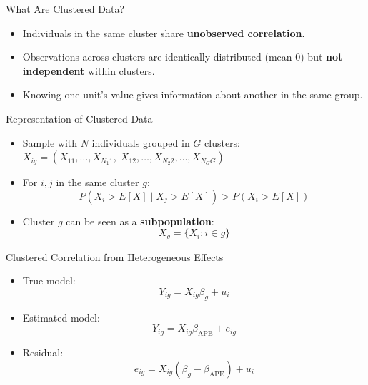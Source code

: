 \documentclass[
  ignorenonframetext,
]{beamer}
\providecommand{\tightlist}{%
  \setlength{\itemsep}{0pt}\setlength{\parskip}{0pt}}
\begin{document}
\begin{frame}{What Are Clustered Data?}
\label{what-are-clustered-data}
\begin{itemize}
\tightlist
\item
  Individuals in the same cluster share \textbf{unobserved
  correlation}.\\
\item
  Observations across clusters are identically distributed (mean 0) but
  \textbf{not independent} within clusters.\\
\item
  Knowing one unit's value gives information about another in the same
  group.
\end{itemize}
\end{frame}

\begin{frame}{Representation of Clustered Data}
\label{representation-of-clustered-data}
\begin{itemize}
\tightlist
\item
  Sample with \(N\) individuals grouped in \(G\) clusters:\\
  \(X_{ig} = (X_{11},\dots,X_{N_1 1},\; X_{12},\dots,X_{N_2 2},\dots,X_{N_G G})\)\\
\item
  For \(i,j\) in the same cluster \(g\):\\
  \[
  P(X_i > E[X] \mid X_j > E[X]) > P(X_i > E[X])
  \]
\item
  Cluster \(g\) can be seen as a \textbf{subpopulation}:\\
  \[
  X_g = \{X_i: i \in g\}
  \]
\end{itemize}
\end{frame}

\begin{frame}
\end{frame}

\begin{frame}{Clustered Correlation from Heterogeneous Effects}
\label{clustered-correlation-from-heterogeneous-effects}
\begin{itemize}
\tightlist
\item
  True model:\\
  \[
  Y_{ig} = X_{ig}\beta_g + u_i
  \]
\item
  Estimated model:\\
  \[
  Y_{ig} = X_{ig}\beta_{\text{APE}} + e_{ig}
  \]
\item
  Residual:\\
  \[
  e_{ig} = X_{ig}(\beta_g - \beta_{\text{APE}}) + u_i
  \]
\end{itemize}
\end{frame}
\end{document}
